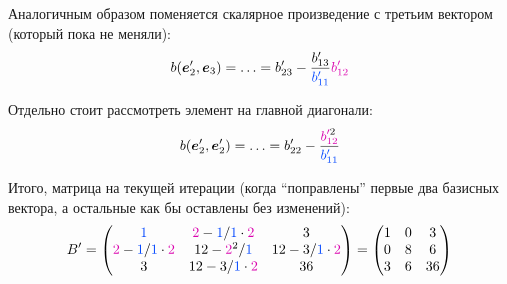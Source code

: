 \documentclass[a4paper,12pt]{article}
\begin{document}
\begin{example}
    Аналогичным образом поменяется скалярное произведение с третьим вектором (который пока не меняли):
    \[
      b(\bds e_2', \bds e_3) = \ldots = b'_{23} - \frac{b'_{13}}{\textcolor{blue}{b'_{11}}} \textcolor{pink}{b'_{12}}
    \]
    
    Отдельно стоит рассмотреть элемент на главной диагонали:
    \[
      b(\bds e_2', \bds e_2') = \ldots = b'_{22} - \frac{{\textcolor{pink}{b}}_{\textcolor{pink}{12}}^{\textcolor{pink}{\prime} 2}}{\textcolor{blue}{b'_{11}}}
    \]
    
    Итого, матрица на текущей итерации (когда ``поправлены'' первые два базисных вектора, а остальные как бы оставлены без изменений):
    \[
      B' = \begin{pmatrix}
        \textcolor{blue}{1}
          & \textcolor{pink}{2} - \textcolor{blue}{1}/\textcolor{blue}{1} \cdot \textcolor{pink}{2}
          & 3\\
        \textcolor{pink}{2} - \textcolor{blue}{1}/\textcolor{blue}{1} \cdot \textcolor{pink}{2}
          & 12 - {\textcolor{pink}{2}}^2/\textcolor{blue}{1}
          & 12 - 3/\textcolor{blue}{1} \cdot \textcolor{pink}{2}\\
        3
          & 12 - 3/\textcolor{blue}{1} \cdot \textcolor{pink}{2}
          & 36
      \end{pmatrix} = \begin{pmatrix}
        1 & 0 & 3\\
        0 & 8 & 6\\
        3 & 6 & 36
      \end{pmatrix}
    \]
    

\end{example}
\end{document}
